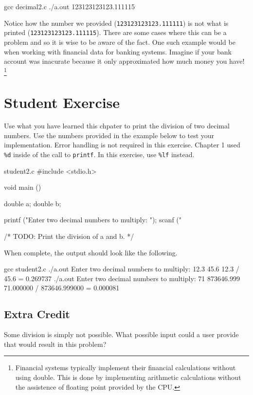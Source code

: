 \begin{Terminal}
gcc decimal2.c
./a.out
123123123123.111115
\end{Terminal}

Notice how the number we provided (\verb|123123123123.111111|) is not what is
printed (\verb|123123123123.111115|).  There are some cases where this can be a
problem and so it is wise to be aware of the fact.  One such example would be
when working with financial data for banking systems.  Imagine if your bank
account was inacurate because it only approximated how much money you have!
\footnote{Financial systems typically implement their financial calculations
without using double. This is done by implementing arithmetic calculations
without the assistence of floating point provided by the CPU.}


\section{Student Exercise}

Use what you have learned this chpater to print the division of two decimal
numbers. Use the numbers provided in the example below to test your
implementation. Error handling is not required in this exercise. Chapter 1 used
\verb|%d| inside of the call to \verb|printf|. In this exercise, use \verb|%lf|
instead.

\begin{code}{student2.c}
#include <stdio.h>

void main ()
{
    double a;
    double b;

    printf ("Enter two decimal numbers to multiply: ");
    scanf ("%

    /* TODO: Print the division of a and b. */
}
\end{code}

When complete, the output should look like the following.

\begin{Terminal}
gcc student2.c
./a.out
Enter two decimal numbers to multiply: 12.3 45.6
12.3 / 45.6 = 0.269737
./a.out
Enter two decimal numbers to multiply: 71 873646.999
71.000000 / 873646.999000 = 0.000081
\end{Terminal}

\subsection{Extra Credit}

Some division is simply not possible. What possible input could a user provide
that would result in this problem?
